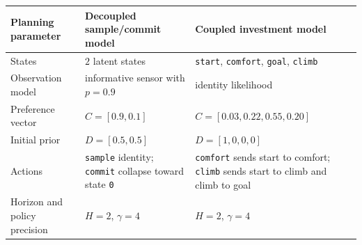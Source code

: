 \documentclass[
  english,
]{article}
\newcounter{none} %
\begin{document}
{\def\LTcaptype{none} %
\begin{longtable}[]{@{}
  >{\raggedright\arraybackslash}p{}
  >{\raggedright\arraybackslash}p{}
  >{\raggedright\arraybackslash}p{}@{}}
\toprule\noalign{}
\begin{minipage}[b]{\linewidth}\raggedright
Planning parameter
\end{minipage} & \begin{minipage}[b]{\linewidth}\raggedright
Decoupled sample/commit model
\end{minipage} & \begin{minipage}[b]{\linewidth}\raggedright
Coupled investment model
\end{minipage} \\
\midrule\noalign{}
\endhead
\bottomrule\noalign{}
\endlastfoot
States & \(2\) latent states & \texttt{start}, \texttt{comfort},
\texttt{goal}, \texttt{climb} \\
Observation model & informative sensor with \(p=0.9\) & identity
likelihood \\
Preference vector & \(C=[0.9,0.1]\) & \(C=[0.03,0.22,0.55,0.20]\) \\
Initial prior & \(D=[0.5,0.5]\) & \(D=[1,0,0,0]\) \\
Actions & \texttt{sample} identity; \texttt{commit} collapse toward
state \texttt{0} & \texttt{comfort} sends start to comfort;
\texttt{climb} sends start to climb and climb to goal \\
Horizon and policy precision & \(H=2\), \(\gamma=4\) & \(H=2\),
\(\gamma=4\) \\
\end{longtable}
}
\end{document}
